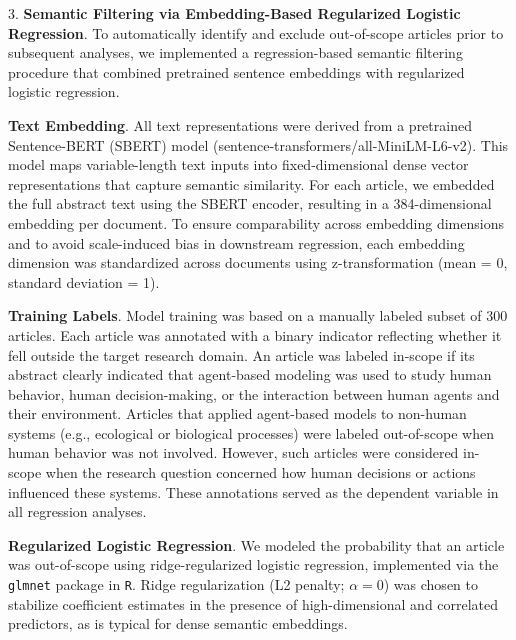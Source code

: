 \documentclass[pdflatex,sn-mathphys-num]{sn-jnl}%
\theoremstyle{thmstyleone}%
\theoremstyle{thmstyletwo}%
\theoremstyle{thmstylethree}%
\begin{document}
\vspace{1em}

{\Large 3.} \textbf{Semantic Filtering via Embedding-Based Regularized Logistic Regression}.
To automatically identify and exclude out-of-scope articles prior to subsequent analyses, we implemented a regression-based semantic filtering procedure that combined pretrained sentence embeddings with regularized logistic regression.

\vspace{0.70em}

\textbf{Text Embedding}.
All text representations were derived from a pretrained Sentence-BERT (SBERT) model (sentence-transformers/all-MiniLM-L6-v2). This model maps variable-length text inputs into fixed-dimensional dense vector representations that capture semantic similarity. For each article, we embedded the full abstract text using the SBERT encoder, resulting in a 384-dimensional embedding per document. To ensure comparability across embedding dimensions and to avoid scale-induced bias in downstream regression, each embedding dimension was standardized across documents using z-transformation (mean = 0, standard deviation = 1).

\vspace{0.70em}

\textbf{Training Labels}.
Model training was based on a manually labeled subset of 300 articles. Each article was annotated with a binary indicator reflecting whether it fell outside the target research domain. An article was labeled in-scope if its abstract clearly indicated that agent-based modeling was used to study human behavior, human decision-making, or the interaction between human agents and their environment. Articles that applied agent-based models to non-human systems (e.g., ecological or biological processes) were labeled out-of-scope when human behavior was not involved. However, such articles were considered in-scope when the research question concerned how human decisions or actions influenced these systems. These annotations served as the dependent variable in all regression analyses.

\vspace{0.70em}

\textbf{Regularized Logistic Regression}.
We modeled the probability that an article was out-of-scope using ridge-regularized logistic regression, implemented via the \texttt{glmnet} package in \texttt{R}. Ridge regularization (L2 penalty; $\alpha = 0$) was chosen to stabilize coefficient estimates in the presence of high-dimensional and correlated predictors, as is typical for dense semantic embeddings.
\end{document}
